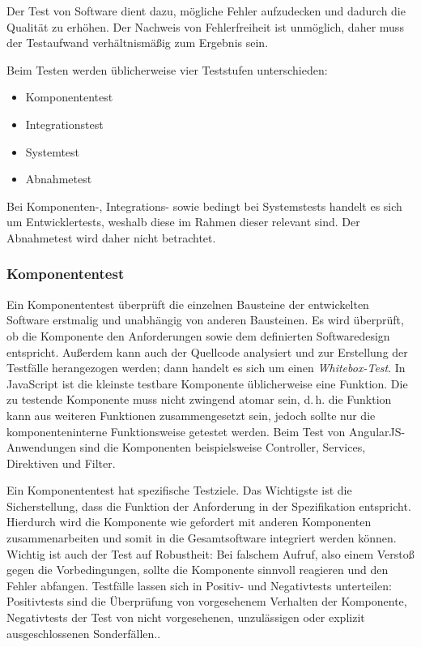 Der Test von Software dient dazu, mögliche Fehler aufzudecken und dadurch die Qualität zu erhöhen. Der Nachweis von Fehlerfreiheit ist unmöglich, daher muss der Testaufwand verhältnismäßig zum Ergebnis sein\cite[][14\psqq]{spillner}. 

Beim Testen werden üblicherweise vier Teststufen unterschieden\cite[][42\psq]{spillner}:
\begin{itemize}
	\item Komponententest
	\item Integrationstest
	\item Systemtest
	\item Abnahmetest
\end{itemize}
Bei Komponenten-, Integrations- sowie bedingt bei Systemstests handelt es sich um Entwicklertests, weshalb diese im Rahmen dieser \titleDocument{} relevant sind. Der Abnahmetest wird daher nicht betrachtet.

\subsubsection{Komponententest}
Ein Komponententest überprüft die einzelnen Bausteine der entwickelten Software erstmalig und unabhängig von anderen Bausteinen. Es wird überprüft, ob die Komponente den Anforderungen sowie dem definierten Softwaredesign entspricht. Außerdem kann auch der Quellcode analysiert und zur Erstellung der Testfälle herangezogen werden; dann handelt es sich um einen \textit{Whitebox-Test}.\cite[][44]{spillner} In JavaScript ist die kleinste testbare Komponente üblicherweise eine Funktion\cite{smashing-unit}. Die zu testende Komponente muss nicht zwingend atomar sein, d.\,h. die Funktion kann aus weiteren Funktionen zusammengesetzt sein, jedoch sollte nur die komponenteninterne Funktionsweise getestet werden\cite[][45]{spillner}. Beim Test von AngularJS-Anwendungen sind die Komponenten beispielsweise Controller, Services, Direktiven und Filter.

Ein Komponententest hat spezifische Testziele. Das Wichtigste ist die Sicherstellung, dass die Funktion der Anforderung in der Spezifikation entspricht. Hierdurch wird die Komponente wie gefordert mit anderen Komponenten zusammenarbeiten und somit in die Gesamtsoftware integriert werden können. Wichtig ist auch der Test auf Robustheit: Bei falschem Aufruf, also einem Verstoß gegen die Vorbedingungen, sollte die Komponente sinnvoll reagieren und den Fehler abfangen. Testfälle lassen sich in Positiv- und Negativtests unterteilen: Positivtests sind die Überprüfung von vorgesehenem Verhalten der Komponente, Negativtests der Test von nicht vorgesehenen, unzulässigen oder explizit ausgeschlossenen Sonderfällen.\cite[][48]{spillner}.

